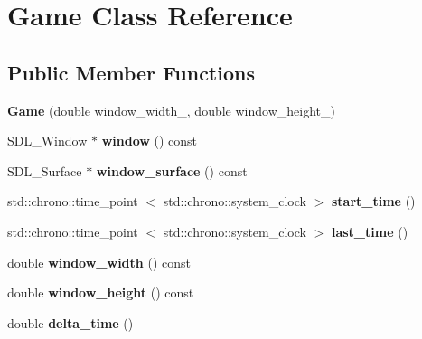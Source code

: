 \hypertarget{classGame}{\section{\-Game \-Class \-Reference}
\label{classGame}
}
\subsection*{\-Public \-Member \-Functions}
\begin{DoxyCompactItemize}
\item 
\hypertarget{classGame_a8b5b5873e5ad0bd4e64681cb8a5d2fcd}{{\bfseries \-Game} (double window\-\_\-width\-\_, double window\-\_\-height\-\_)}\label{classGame_a8b5b5873e5ad0bd4e64681cb8a5d2fcd}

\item 
\hypertarget{classGame_aba9fbfbabee61c3e746fe76f7e2f1efd}{\-S\-D\-L\-\_\-\-Window $\ast$ {\bfseries window} () const }\label{classGame_aba9fbfbabee61c3e746fe76f7e2f1efd}

\item 
\hypertarget{classGame_ac42f59a2a13182ff4846d2ca154309f4}{\-S\-D\-L\-\_\-\-Surface $\ast$ {\bfseries window\-\_\-surface} () const }\label{classGame_ac42f59a2a13182ff4846d2ca154309f4}

\item 
\hypertarget{classGame_a1f3b73d9b488531e25c62bc9e7dcd96c}{std\-::chrono\-::time\-\_\-point\*
$<$ std\-::chrono\-::system\-\_\-clock $>$ {\bfseries start\-\_\-time} ()}\label{classGame_a1f3b73d9b488531e25c62bc9e7dcd96c}

\item 
\hypertarget{classGame_af888bddeb4f07bf580ff0a791fca3c9d}{std\-::chrono\-::time\-\_\-point\*
$<$ std\-::chrono\-::system\-\_\-clock $>$ {\bfseries last\-\_\-time} ()}\label{classGame_af888bddeb4f07bf580ff0a791fca3c9d}

\item 
\hypertarget{classGame_a6959d4512fbd3613d59ec8e2c6f678b3}{double {\bfseries window\-\_\-width} () const }\label{classGame_a6959d4512fbd3613d59ec8e2c6f678b3}

\item 
\hypertarget{classGame_a1a4db4436961b31b97c97a7c7c485a2d}{double {\bfseries window\-\_\-height} () const }\label{classGame_a1a4db4436961b31b97c97a7c7c485a2d}

\item 
\hypertarget{classGame_aa87c0c432bd47725700d6138b11e1937}{double {\bfseries delta\-\_\-time} ()}\label{classGame_aa87c0c432bd47725700d6138b11e1937}


\end{DoxyCompactItemize}
